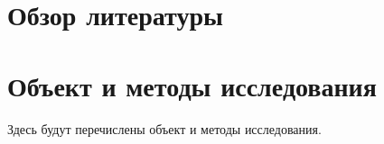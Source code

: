 

\section{Обзор литературы}
\label{section:literature}




\section{Объект и методы исследования}
\label{section:object}

Здесь будут перечислены объект и методы исследования.
